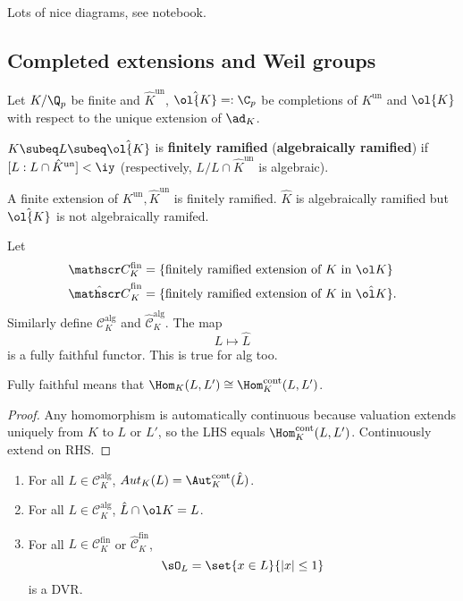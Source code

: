 Lots of nice diagrams, see notebook.
\subsection{Completed extensions and Weil groups}
Let $K/\Q_p$ be finite and $\hat{K}^{\text{un}}$, $\hat{\ol{K}}=:\C_p$ be completions of $K^{\text{un}}$ and $\ol{K}$ with respect to the unique extension of $\ad_K$. 
\begin{df}
$K\subeq L\subeq \hat{\ol{K}}$ is \textbf{finitely ramified} (\textbf{algebraically ramified}) if $[L:L\cap \hat{K}^{\text{un}}]<\iy$ (respectively, $L/L\cap \hat{K}^{\text{un}}$ is algebraic).
\end{df}
\begin{ex}
A finite extension of $K^{\text{un}}, \hat{K}^{\text{un}}$ is finitely ramified. $\hat K$ is algebraically ramified but $\hat{\ol{K}}$ is not algebraically ramifed.
\end{ex}
\begin{pr}
Let
\begin{align*}
\mathscr C^{\text{fin}}_K &=\{\text{finitely ramified extension of $K$ in $\ol K$}\}\\
\hat{\mathscr C}^{\text{fin}}_K &=\{\text{finitely ramified extension of $K$ in $\hat{\ol K}$}\}.
\end{align*}
Similarly define $\mathscr C^{\text{alg}}_K$ and $\hat{\mathscr C}^{\text{alg}}_K$. The map
\[
L\mapsto \hat{L}
\]
is a fully faithful functor. This is true for alg too.
\end{pr}
Fully faithful means that $\Hom_K(L,L')\cong \Hom_K^{\text{cont}}(L,L')$. 
\begin{proof}
Any homomorphism is automatically continuous because valuation extends uniquely from $K$ to $L$ or $L'$, so the LHS equals $\Hom_K^{\text{cont}}(L,L')$. Continuously extend on RHS.
\end{proof}
\begin{cor}
\begin{enumerate}
\item
For all $L\in \mathscr C_K^{\text{alg}}$, $Aut_K(L)=\Aut_K^{\text{cont}}(\hat L)$.
\item
For all $L\in \mathscr C_K^{\text{alg}}$, $\hat{L}\cap \ol K=L$.
\item
For all $L\in \mathscr C_K^{\text{fin}}$ or $\hat{\mathscr{C}}_K^{\text{fin}}$, 
\[\sO_L=\set{x\in L}{|x|\le 1}\]
is a DVR.
\end{enumerate}
\end{cor}

